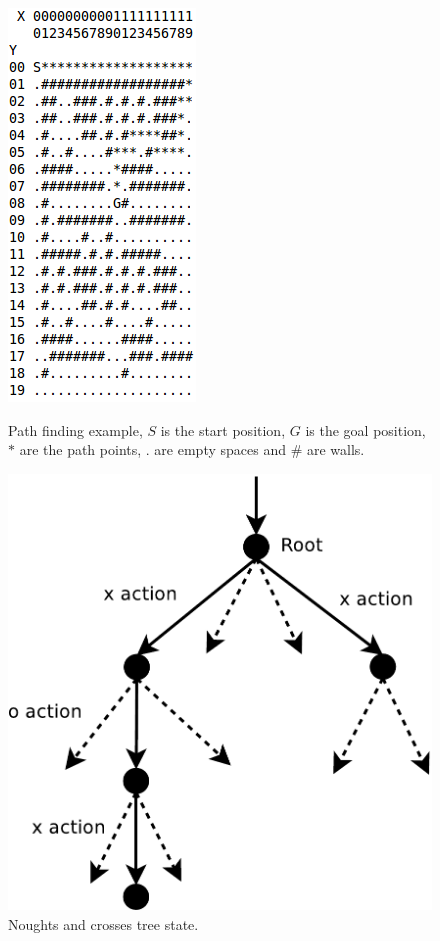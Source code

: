 \documentclass[12pt]{article}
\begin{document}
\begin{figure}[htbp!]
\centering
\begin{minipage}[t]{0.3\linewidth}
	\includegraphics[scale=0.6]{images/a_star_res1}
	\caption{Path finding example, $S$ is the start position, $G$ is the goal position, $*$ are the path points, $.$ are empty spaces and \# are walls.}
	\label{fig:A_start}
\end{minipage}
\quad
\begin{minipage}[t]{0.45\linewidth}
	\includegraphics[scale=0.4]{images/ttt_tree}
	\caption{Noughts and crosses tree state.}
	\label{fig:ttt_tree}
\end{minipage}
\end{figure}
\end{document}
